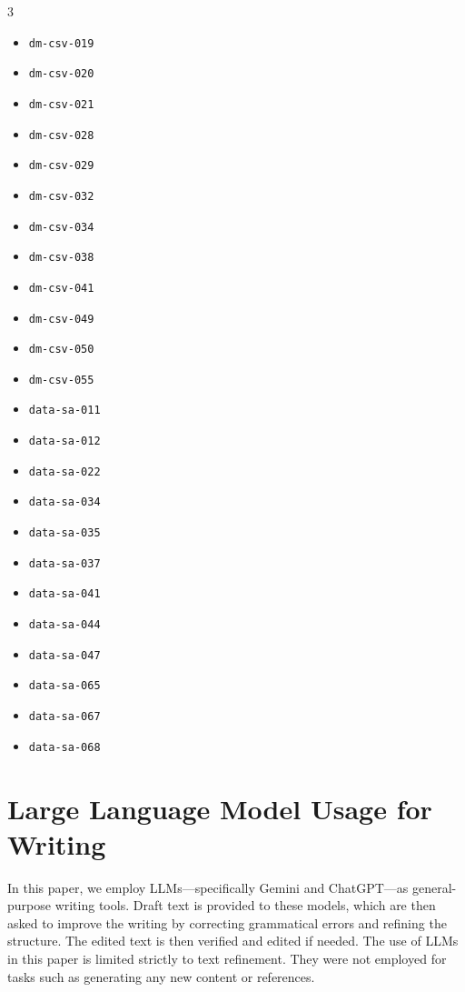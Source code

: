 \begin{multicols}{3}
\begin{itemize}[nosep, leftmargin=*]
        \item \texttt{dm-csv-019}
        \item \texttt{dm-csv-020}
        \item \texttt{dm-csv-021}
        \item \texttt{dm-csv-028}
        \item \texttt{dm-csv-029}
        \item \texttt{dm-csv-032}
        \item \texttt{dm-csv-034}
        \item \texttt{dm-csv-038}
        \item \texttt{dm-csv-041}
        \item \texttt{dm-csv-049}
        \item \texttt{dm-csv-050}
        \item \texttt{dm-csv-055}
        \item \texttt{data-sa-011}
        \item \texttt{data-sa-012}
        \item \texttt{data-sa-022}
        \item \texttt{data-sa-034}
        \item \texttt{data-sa-035}
        \item \texttt{data-sa-037}
        \item \texttt{data-sa-041}
        \item \texttt{data-sa-044}
        \item \texttt{data-sa-047}
        \item \texttt{data-sa-065}
        \item \texttt{data-sa-067}
        \item \texttt{data-sa-068}
    \end{itemize}
\end{multicols}

\newpage
\section{Large Language Model Usage for Writing}

In this paper, we employ LLMs---specifically Gemini and ChatGPT---as general-purpose writing tools. Draft text is provided to these models, which are then asked to improve the writing by correcting grammatical errors and refining the structure. The edited text is then verified and edited if needed. The use of LLMs in this paper is limited strictly to text refinement. They were not employed for tasks such as generating any new content or references.
